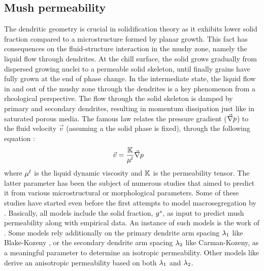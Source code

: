 \subsection{Mush permeability}
The dendritic geometry is crucial in solidification theory as it exhibits lower solid fraction compared to a microstructure formed by planar growth.
This fact has consequences on the fluid-structure interaction in the mushy zone, namely the liquid flow through dendrites. At the chill surface,
the solid  grows gradually from dispersed growing nuclei to a permeable solid skeleton, until finally grains have fully grown at the end of phase change.
In the intermediate state, the liquid flow in and out of the mushy zone through the dendrites is a key phenomenon from a rheological perspective.
The flow through the solid skeleton is damped by primary and secondary dendrites, resulting in momentum dissipation just like in saturated porous media. 
The famous \citet{darcy_les_1856} law relates the pressure gradient ($\vec{\nabla} p$) to the fluid velocity $\vec{v}$ (assuming a the solid phase is fixed), 
through the following equation \citep{rappaz_numerical_2003}:
\begin{align}
\label{eq:darcy}
& \vec{v} = \frac{\mathbb{K}}{\mu^l} \vec{\nabla} p
\end{align}
where $\mu^l$ is the liquid dynamic viscosity and $\mathbb{K}$ is the permeability tensor. The latter parameter has been the subject of numerous studies that aimed
to predict it from various microstructural or morphological parameters.
Some of these studies have started even before the first attempts to model macrosegregation by \citet{flemings_macrosegregation:_1967, flemings_macrosegregation:_1968-1,flemings_macrosegregation:_1968}. 
Basically, all models include the solid fraction, ${g^s}$, as input to predict mush permeability along with empirical data. 
An instance of such models is the work of \citet{xu_gravity-_1991}.
Some models rely additionally on the primary dendrite arm spacing ${\lambda}_{1}$ like Blake-Kozeny \citep{ramirez_evaluation_2003}, or the secondary 
dendrite arm spacing ${\lambda}_{2}$ like Carman-Kozeny, as a meaningful parameter to determine an isotropic permeability. 
Other models like \citet{poirier_permeability_1987,felicelli_simulation_1991} derive an anisotropic permeability based on both ${\lambda}_{1}$ and ${\lambda}_{2}$.

